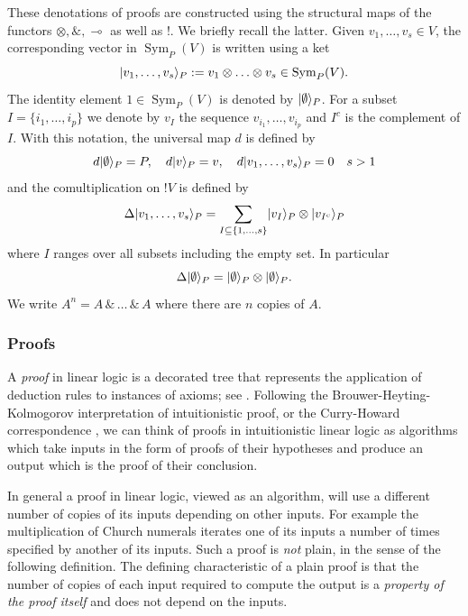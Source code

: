 \documentclass[english,letter paper,12pt,reqno]{article}
\DeclarePairedDelimiter\ket{\lvert}{\rangle}
\theoremstyle{definition}
\begin{document}
These denotations of proofs are constructed using the structural maps of the functors $\otimes, \&, \multimap$ as well as ${!}$. We briefly recall the latter. Given $v_1, \ldots, v_s \in V$, the corresponding vector in $\operatorname{Sym}_P(V)$ is written using a ket
\begin{equation}
    \ket{v_1, \ldots, v_s}_P := v_1 \otimes \ldots \otimes v_s \in \operatorname{Sym}_P(V).
\end{equation}
The identity element $1 \in \operatorname{Sym}_P(V)$ is denoted by $\ket{\emptyset}_P$. For a subset $I = \{i_1, \ldots, i_p\}$ we denote by $v_I$ the sequence $v_{i_1}, \ldots, v_{i_p}$ and $I^c$ is the complement of $I$. With this notation, the universal map $d$ is defined by
\begin{equation}
    d\ket{\emptyset}_P = P,\quad d\ket{v}_P = v,\quad d\ket{v_1, \ldots, v_s}_P = 0\quad s>1
\end{equation}
and the comultiplication on ${!}V$ is defined by
\begin{equation}
    \Delta \ket{v_1, \ldots, v_s}_P = \sum_{I \subseteq \{1, \ldots, s\}} \ket{v_I}_P \otimes \ket{v_{I^{c}}}_P
\end{equation}
where $I$ ranges over all subsets including the empty set. In particular
\begin{equation}
    \Delta\ket{\emptyset}_P = \ket{\emptyset}_P \otimes \ket{\emptyset}_P.
\end{equation}
We write $A^n = A \,\& \, \ldots \, \& \, A$ where there are $n$ copies of $A$. %

\subsubsection{Proofs}

A \emph{proof} in linear logic is a decorated tree that represents the application of deduction rules to instances of axioms; see \cite{girard1987linear,mellies2009categorical}. Following the Brouwer-Heyting-Kolmogorov interpretation \cite{troelstra2011history} of intuitionistic proof, or the Curry-Howard correspondence \cite{howard1980formulae}, we can think of proofs in intuitionistic linear logic as algorithms which take inputs in the form of proofs of their hypotheses and produce an output which is the proof of their conclusion.

In general a proof in linear logic, viewed as an algorithm, will use a different number of copies of its inputs depending on other inputs. For example the multiplication of Church numerals iterates one of its inputs a number of times specified by another of its inputs. Such a proof is \emph{not} plain, in the sense of the following definition. The defining characteristic of a plain proof is that the number of copies of each input required to compute the output is a \emph{property of the proof itself} and does not depend on the inputs. %
\end{document}
